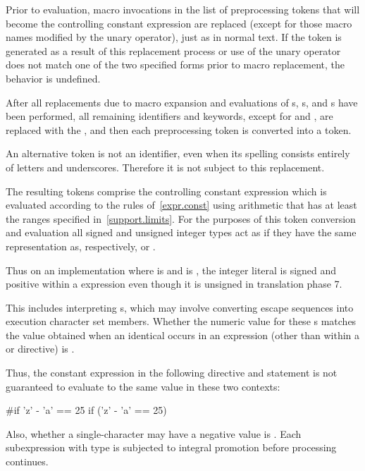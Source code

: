 \pnum
Prior to evaluation,
macro invocations in the list of preprocessing tokens
that will become the controlling constant expression
are replaced
(except for those macro names modified by the
unary operator),
just as in normal text.
If the token
is generated as a result of this replacement process
or use of the
unary operator does not match one of the two specified forms
prior to macro replacement,
the behavior is undefined.

\pnum
After all replacements due to macro expansion and
evaluations of
s,
s, and
s
have been performed,
all remaining identifiers and keywords,
except for
and
,
are replaced with the 
,
and then each preprocessing token is converted into a token.
\begin{note}
An alternative
token is not an identifier,
even when its spelling consists entirely of letters and underscores.
Therefore it is not subject to this replacement.
\end{note}

\pnum
The resulting tokens comprise the controlling constant expression
which is evaluated according to the rules of~\ref{expr.const}
using arithmetic that has at least the ranges specified
in~\ref{support.limits}. For the purposes of this token conversion and evaluation
all signed and unsigned integer types
act as if they have the same representation as, respectively,
 or .
\begin{note}
Thus on an
implementation where  is 
and  is ,
the integer literal  is signed and positive within a 
expression even though it is unsigned in translation phase
7.
\end{note}
This includes interpreting s, which may involve
converting escape sequences into execution character set members.
Whether the numeric value for these s
matches the value obtained when an identical 
occurs in an expression
(other than within a
or
directive)
is .
\begin{note}
Thus, the constant expression in the following
directive and
 statement
is not guaranteed to evaluate to the same value in these two
contexts:
\begin{codeblock}
#if 'z' - 'a' == 25
if ('z' - 'a' == 25)
\end{codeblock}
\end{note}
Also, whether a single-character  may have a negative
value is .
Each subexpression with type
is subjected to integral promotion before processing continues.

